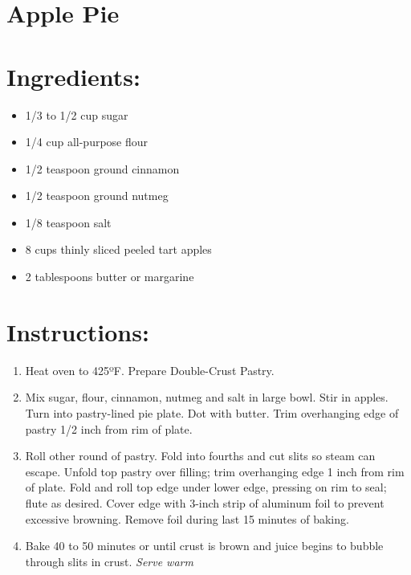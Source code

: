 \section{Apple Pie}
\section{Ingredients:}
\begin{itemize}
\item 1/3 to 1/2 cup sugar
\item 1/4 cup all-purpose flour
\item 1/2 teaspoon ground cinnamon
\item 1/2 teaspoon ground nutmeg
\item 1/8 teaspoon salt
\item 8 cups thinly sliced peeled tart apples
\item 2 tablespoons butter or margarine
\end{itemize}

\section{Instructions:}
\begin{enumerate}
\item Heat oven to 425ºF. Prepare Double-Crust Pastry.
\item Mix sugar, flour, cinnamon, nutmeg and salt in large bowl. Stir in apples. Turn into pastry-lined pie plate. Dot with butter. Trim overhanging edge of pastry 1/2 inch from rim of plate.
\item Roll other round of pastry. Fold into fourths and cut slits so steam can escape. Unfold top pastry over filling; trim overhanging edge 1 inch from rim of plate. Fold and roll top edge under lower edge, pressing on rim to seal; flute as desired. Cover edge with 3-inch strip of aluminum foil to prevent excessive browning. Remove foil during last 15 minutes of baking.
\item Bake 40 to 50 minutes or until crust is brown and juice begins to bubble through slits in crust.
\emph{Serve warm} 

\end{enumerate}
